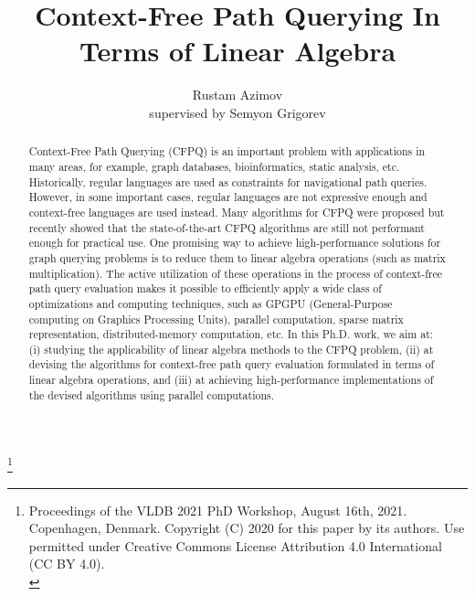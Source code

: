 \documentclass[sigconf, nonacm]{acmart}
\newcommand\vldbdoi{XX.XX/XXX.XX}
\newcommand\vldbpages{XXX-XXX}
\newcommand\vldbvolume{14}
\newcommand\vldbissue{1}
\newcommand\vldbyear{2021}
\newcommand\vldbauthors{\authors}
\newcommand\vldbtitle{\shorttitle}
\newcommand\vldbpagestyle{plain}
\begin{document}
\title{Context-Free Path Querying In Terms of Linear Algebra}

\author{Rustam Azimov \\ supervised by Semyon Grigorev} 

\begin{abstract}
Context-Free Path Querying (CFPQ) is an important problem with applications in many areas, for example, graph databases, bioinformatics, static analysis, etc. Historically, regular languages are used as constraints for
navigational path queries. However, in some important cases, regular languages are not expressive enough and context-free languages are used instead. Many algorithms for CFPQ were proposed but recently showed
that the state-of-the-art CFPQ algorithms are still not performant enough for practical use. One promising way to achieve
high-performance solutions for graph querying problems is to
reduce them to linear algebra operations (such as matrix
multiplication). The active utilization of these operations in the process of context-free path query evaluation
makes it possible to efficiently apply a wide class of optimizations
and computing techniques, such as GPGPU (General-Purpose computing on Graphics Processing Units), parallel computation, sparse
matrix representation, distributed-memory computation, etc. In this Ph.D. work, we aim at: (i) studying the applicability of linear algebra methods to the CFPQ problem, (ii) at devising the algorithms for context-free path query evaluation formulated in terms of linear algebra operations, and (iii) at achieving high-performance implementations of the devised algorithms using parallel computations.
\end{abstract}

\maketitle

\pagestyle{\vldbpagestyle}
\begingroup
\renewcommand\thefootnote{}\footnote{\noindent
Proceedings of the VLDB 2021 PhD Workshop, August 16th, 2021. Copenhagen, Denmark. Copyright (C) 2020 for this paper by its authors. Use permitted under Creative Commons License Attribution 4.0 International (CC BY 4.0). \\
}\addtocounter{footnote}{-1}\endgroup
\end{document}
